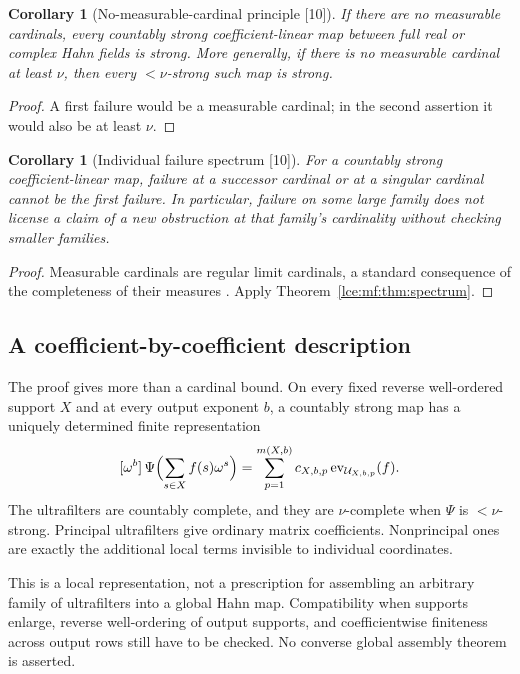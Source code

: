 \documentclass[11pt,letterpaper]{article}
\numberwithin{equation}{section}
\newtheorem{corollary}[theorem]{Corollary}
\theoremstyle{definition}
\theoremstyle{remark}
\newcommand{\coef}[2]{[\omega^{#1}]\,#2}
\newcommand{\thref}[1]{Theorem~\ref{#1}}
\newcommand{\src}[1]{\textup{\textsf{\small[#1]}}}%
\newcommand{\ev}{\operatorname{ev}}
\begin{document}
\begin{corollary}[No-measurable-cardinal principle \src{10}]\label{lce:mf:cor:nomeas}
If there are no measurable cardinals, every countably strong
coefficient-linear map between full real or complex Hahn fields is strong.
More generally, if there is no measurable cardinal at least $\nu$, then
every ${<}\nu$-strong such map is strong.
\end{corollary}
\begin{proof}
A first failure would be a measurable cardinal; in the second assertion it
would also be at least $\nu$.
\end{proof}

\begin{corollary}[Individual failure spectrum \src{10}]\label{lce:mf:cor:individual}
For a countably strong coefficient-linear map, failure at a successor
cardinal or at a singular cardinal cannot be the first failure. In
particular, failure on some large family does not license a claim of a new
obstruction at that family's cardinality without checking smaller families.
\end{corollary}
\begin{proof}
Measurable cardinals are regular limit cardinals, a standard consequence of
the completeness of their measures \cite{Jech}. Apply
\thref{lce:mf:thm:spectrum}.
\end{proof}

\subsection{A coefficient-by-coefficient description}
The proof gives more than a cardinal bound. On every fixed reverse
well-ordered support $X$ and at every output exponent $b$, a countably
strong map has a uniquely determined finite representation
\begin{equation}\label{lce:mf:eq:matrixultra}
 \coef b{\Psi\Bigl(\sum_{s\in X}f(s)\omega^s\Bigr)}
   =\sum_{p=1}^{m(X,b)}c_{X,b,p}\ev_{\mathcal U_{X,b,p}}(f).
\end{equation}
The ultrafilters are countably complete, and they are $\nu$-complete when
$\Psi$ is ${<}\nu$-strong. Principal ultrafilters give ordinary matrix
coefficients. Nonprincipal ones are exactly the additional local terms
invisible to individual coordinates.

This is a local representation, not a prescription for assembling an
arbitrary family of ultrafilters into a global Hahn map. Compatibility when
supports enlarge, reverse well-ordering of output supports, and
coefficientwise finiteness across output rows still have to be checked. No
converse global assembly theorem is asserted.
\end{document}
